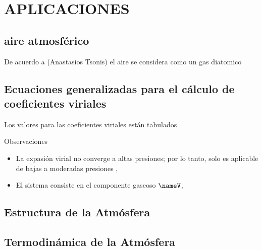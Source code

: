 \section{APLICACIONES}

\subsection{aire atmosférico}
De acuerdo a \parencite[postnote]{Tsonis}(Anastasios Tsonis) el aire se considera como un gas diatomico

\subsection{Ecuaciones generalizadas para el cálculo de coeficientes viriales}
Los valores para las coeficientes viriales están tabulados


Observaciones
\begin{itemize}
  \item La expasión virial no converge a altas presiones; por lo tanto, solo es aplicable de bajas a moderadas presiones   {\parencite{Engel2019}},
  \item El sistema consiste en el componente gaseoso $\nameV$,
\end{itemize}


\subsection{Estructura de la Atmósfera}
\subsection{Termodinámica de la Atmósfera}

 